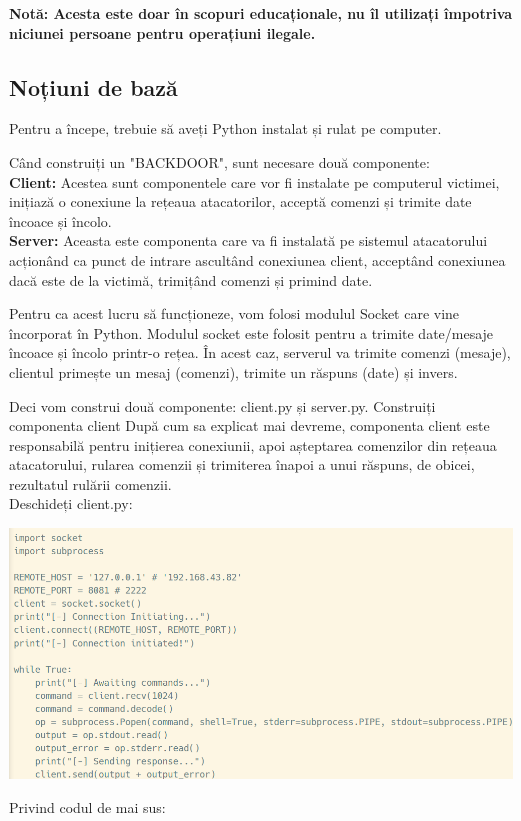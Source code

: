 \documentclass[oneside,20pt]{article}          %
\begin{document}
\textbf{Notă: Acesta este doar în scopuri educaționale, nu îl utilizați împotriva niciunei persoane pentru operațiuni ilegale.}\\


\subsection{Noțiuni de bază}
Pentru a începe, trebuie să aveți Python instalat și rulat pe computer. 


Când construiți un "BACKDOOR", sunt necesare două componente:\\

 
\textbf{Client:} Acestea sunt componentele care vor fi instalate pe computerul victimei, inițiază o conexiune la rețeaua atacatorilor, acceptă comenzi și trimite date încoace și încolo.\\
\textbf{Server:} Aceasta este componenta care va fi instalată pe sistemul atacatorului acționând ca punct de intrare ascultând conexiunea client, acceptând conexiunea dacă este de la victimă, trimițând comenzi și primind date.
 

Pentru ca acest lucru să funcționeze, vom folosi modulul Socket care vine încorporat în Python. Modulul socket este folosit pentru a trimite date/mesaje încoace și încolo printr-o rețea. În acest caz, serverul va trimite comenzi (mesaje), clientul primește un mesaj (comenzi), trimite un răspuns (date) și invers.

Deci vom construi două componente: client.py și server.py.
Construiți componenta client
După cum sa explicat mai devreme, componenta client este responsabilă pentru inițierea conexiunii, apoi așteptarea comenzilor din rețeaua atacatorului, rularea comenzii și trimiterea înapoi a unui răspuns, de obicei, rezultatul rulării comenzii.\\
Deschideți client.py:
  \begin{center}
\includegraphics[height=5 cm]{4.png}
\end{center}
Privind codul de mai sus:
\end{document}
